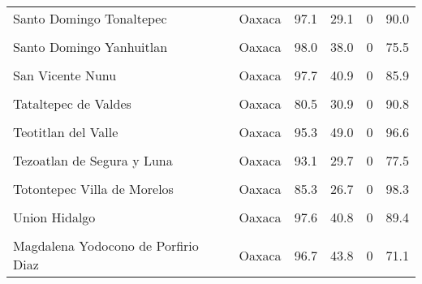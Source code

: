 \documentclass[
]{report}
\begin{document}
\begin{longtable}[t]{llrrrr}
Santo Domingo Tonaltepec & Oaxaca & 97.1 & 29.1 & 0 & 90.0\\
\cellcolor{gray!6}{Santo Domingo Xagacia} & \cellcolor{gray!6}{Oaxaca} & \cellcolor{gray!6}{97.1} & \cellcolor{gray!6}{43.0} & \cellcolor{gray!6}{0} & \cellcolor{gray!6}{99.6}\\
\addlinespace
Santo Domingo Yanhuitlan & Oaxaca & 98.0 & 38.0 & 0 & 75.5\\
\cellcolor{gray!6}{Santos Reyes Papalo} & \cellcolor{gray!6}{Oaxaca} & \cellcolor{gray!6}{86.3} & \cellcolor{gray!6}{29.6} & \cellcolor{gray!6}{0} & \cellcolor{gray!6}{89.4}\\
San Vicente Nunu & Oaxaca & 97.7 & 40.9 & 0 & 85.9\\
\cellcolor{gray!6}{Silacayoapam} & \cellcolor{gray!6}{Oaxaca} & \cellcolor{gray!6}{93.5} & \cellcolor{gray!6}{32.3} & \cellcolor{gray!6}{0} & \cellcolor{gray!6}{67.0}\\
Tataltepec de Valdes & Oaxaca & 80.5 & 30.9 & 0 & 90.8\\
\addlinespace
\cellcolor{gray!6}{Teococuilco de Marcos Perez} & \cellcolor{gray!6}{Oaxaca} & \cellcolor{gray!6}{98.8} & \cellcolor{gray!6}{38.0} & \cellcolor{gray!6}{0} & \cellcolor{gray!6}{95.0}\\
Teotitlan del Valle & Oaxaca & 95.3 & 49.0 & 0 & 96.6\\
\cellcolor{gray!6}{Teotongo} & \cellcolor{gray!6}{Oaxaca} & \cellcolor{gray!6}{96.7} & \cellcolor{gray!6}{32.2} & \cellcolor{gray!6}{0} & \cellcolor{gray!6}{73.7}\\
Tezoatlan de Segura y Luna & Oaxaca & 93.1 & 29.7 & 0 & 77.5\\
\cellcolor{gray!6}{Tlacotepec Plumas} & \cellcolor{gray!6}{Oaxaca} & \cellcolor{gray!6}{98.0} & \cellcolor{gray!6}{27.9} & \cellcolor{gray!6}{0} & \cellcolor{gray!6}{75.2}\\
\addlinespace
Totontepec Villa de Morelos & Oaxaca & 85.3 & 26.7 & 0 & 98.3\\
\cellcolor{gray!6}{La Trinidad Vista Hermosa} & \cellcolor{gray!6}{Oaxaca} & \cellcolor{gray!6}{98.5} & \cellcolor{gray!6}{31.1} & \cellcolor{gray!6}{0} & \cellcolor{gray!6}{60.0}\\
Union Hidalgo & Oaxaca & 97.6 & 40.8 & 0 & 89.4\\
\cellcolor{gray!6}{Villa Diaz Ordaz} & \cellcolor{gray!6}{Oaxaca} & \cellcolor{gray!6}{94.1} & \cellcolor{gray!6}{44.6} & \cellcolor{gray!6}{0} & \cellcolor{gray!6}{96.1}\\
Magdalena Yodocono de Porfirio Diaz & Oaxaca & 96.7 & 43.8 & 0 & 71.1\\

\end{longtable}
\end{document}
